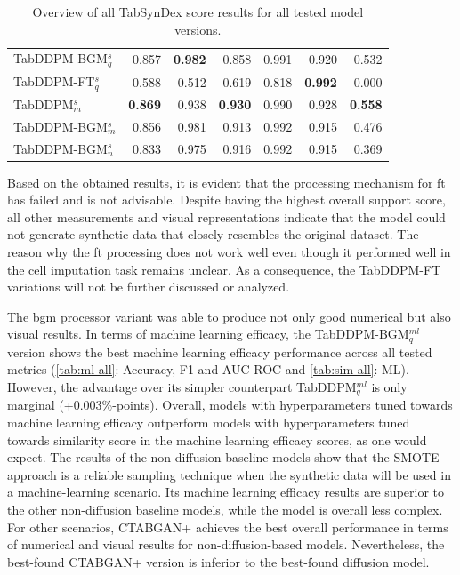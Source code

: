 \begin{table}[h]
\begin{tabular}{lrrrrrr}
		TabDDPM-BGM$^{s}_q$   & 0.857                     & \textbf{0.982} & 0.858                & 0.991          & 0.920            & 0.532          \\
		TabDDPM-FT$^{s}_q$    & 0.588                     & 0.512          & 0.619                & 0.818          & \textbf{0.992}   & 0.000          \\
		TabDDPM$^{s}_m$       & \textbf{0.869}            & 0.938          & \textbf{0.930}       & 0.990          & 0.928            & \textbf{0.558} \\
		TabDDPM-BGM$^{s}_m$   & 0.856                     & 0.981          & 0.913                & 0.992          & 0.915            & 0.476          \\
		TabDDPM-BGM$^{s}_{n}$ & 0.833                     & 0.975          & 0.916                & 0.992          & 0.915            & 0.369          \\
		\bottomrule
	\end{tabular}
	\caption[Overview all TabSynDex results]{Overview of all TabSynDex score results for all tested model versions.}
	\label{tab:sim-all}
\end{table}


Based on the obtained results, it is evident that the processing mechanism for \gls{ft} has failed and is not advisable.
Despite having the highest overall support score, all other measurements and visual representations indicate that the model could not generate synthetic data that closely resembles the original dataset.
The reason why the \gls{ft} processing does not work well even though it performed well in the cell imputation task \cite{zheng2022DiffusionModelsMissing} remains unclear.
As a consequence, the TabDDPM-FT variations will not be further discussed or analyzed.

The \gls{bgm} processor variant was able to produce not only good numerical but also visual results.
In terms of machine learning efficacy, the TabDDPM-BGM$^{ml}_q$ version shows the best machine learning efficacy performance across all tested metrics (\autoref{tab:ml-all}: Accuracy, F1 and AUC-ROC and \autoref{tab:sim-all}: ML).
However, the advantage over its simpler counterpart TabDDPM$^{ml}_q$ is only marginal (+0.003\%-points).
Overall, models with hyperparameters tuned towards machine learning efficacy outperform models with hyperparameters tuned towards similarity score in the machine learning efficacy scores, as one would expect.
The results of the non-diffusion baseline models show that the SMOTE approach is a reliable sampling technique when the synthetic data will be used in a machine-learning scenario.
Its machine learning efficacy results are superior to the other non-diffusion baseline models, while the model is overall less complex.
For other scenarios, CTABGAN+ achieves the best overall performance in terms of numerical and visual results for non-diffusion-based models.
Nevertheless, the best-found CTABGAN+ version is inferior to the best-found diffusion model.

